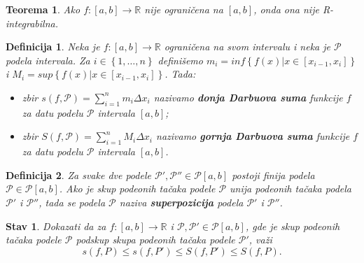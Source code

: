\documentclass{article}
\newtheorem{definicija}{Definicija}[section]
\newtheorem{teorema}{Teorema}[section]
\newtheorem{stav}{Stav}[section]
\begin{document}
\begin{teoremabox}
    \label{teorema_2.1}
    \begin{teorema}
        Ako $f: \left[a,b\right]\longrightarrow\mathbb{R}$ nije ograničena na $\left[a,b\right]$, onda ona nije R-integrabilna.
    \end{teorema}
\end{teoremabox}

\begin{defbox}
    \label{definicija_2.4}
    \begin{definicija}
        Neka je $f:\left[a,b\right]\longrightarrow\mathbb{R}$ ograničena na svom intervalu i neka je $\mathcal{P}$ podela
        intervala. Za $i\in\left\{1,\dotsc,n\right\}$ definišemo $m_i=inf\left\{f\left(x\right)|x\in\left[x_{i-1},x_i\right]\right\}$ i $M_i=sup\left\{f\left(x\right)|x\in\left[x_{i-1},x_i\right]\right\}$.
        Tada:
        \begin{itemize}
            \item zbir $\displaystyle s\left(f,\mathcal{P}\right)=\sum_{i=1}^{n}m_i\Delta x_i$ nazivamo \textbf{donja Darbuova suma} funkcije $f$ za datu podelu $\mathcal{P}$ intervala $\left[a,b\right]$;
            \item zbir $\displaystyle S\left(f,\mathcal{P}\right)=\sum_{i=1}^{n}M_i\Delta x_i$ nazivamo \textbf{gornja Darbuova suma} funkcije $f$ za datu podelu $\mathcal{P}$ intervala $\left[a,b\right]$.
        \end{itemize}
    \end{definicija}
\end{defbox}

\begin{defbox}
    \label{definicija_2.5}
    \begin{definicija}
        Za svake dve podele $\mathcal{P}', \mathcal{P}''\in\mathcal{P}\left[a,b\right]$ postoji finija
        podela $\mathcal{P}\in\mathcal{P}\left[a,b\right]$. Ako je skup podeonih tačaka podele $\mathcal{P}$
        unija podeonih tačaka podela $\mathcal{P}'$ i $\mathcal{P}''$, tada se podela $\mathcal{P}$
        naziva \textbf{superpozicija} podela $\mathcal{P}'$ i $\mathcal{P}''$.
    \end{definicija}
\end{defbox}

\begin{stavbox}
    \label{stav_2.1}
    \begin{stav}
        \label{Stav_2.1}
        Dokazati da za $f: \left[a,b\right]\longrightarrow\mathbb{R}$ i
        $\mathcal{P},\mathcal{P'}\in \mathcal{P}\left[a,b\right]$, gde je skup podeonih tačaka podele $\mathcal{P}$ podskup
        skupa podeonih tačaka podele $\mathcal{P}'$, važi
        $$s\left(f,P\right)\leq s\left(f,P'\right)\leq S\left(f,P'\right)\leq S\left(f,P\right).$$
    \end{stav}
\end{stavbox}
\end{document}
